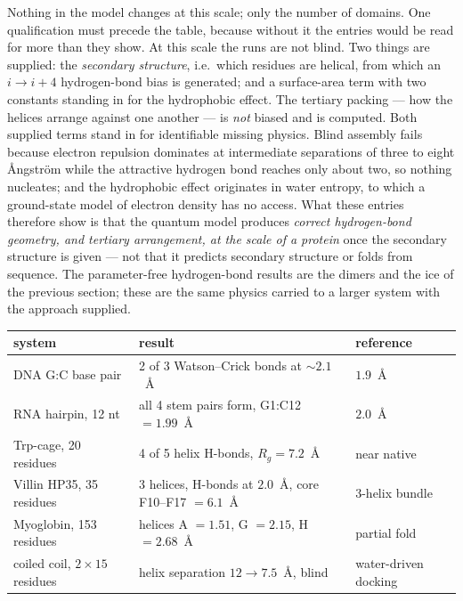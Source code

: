 \documentclass[11pt]{article}
\begin{document}
Nothing in the model changes at this scale; only the number of domains. One qualification must
precede the table, because without it the entries would be read for more than they show. At this
scale the runs are not blind. Two things are supplied: the \emph{secondary structure}, i.e.\ which
residues are helical, from which an $i \rightarrow i{+}4$ hydrogen-bond bias is generated; and a
surface-area term with two constants standing in for the hydrophobic effect. The tertiary
packing --- how the helices arrange against one another --- is \emph{not} biased and is computed.
Both supplied terms stand in for identifiable missing physics. Blind assembly fails because
electron repulsion dominates at intermediate separations of three to eight \AA ngstr\"om while the
attractive hydrogen bond reaches only about two, so nothing nucleates; and the hydrophobic effect
originates in water entropy, to which a ground-state model of electron density has no access.
What these entries therefore show is that the quantum model produces \emph{correct hydrogen-bond
geometry, and tertiary arrangement, at the scale of a protein} once the secondary structure is
given --- not that it predicts secondary structure or folds from sequence. The parameter-free hydrogen-bond results are the dimers and
the ice of the previous section; these are the same physics carried to a larger system with the
approach supplied.

\begin{center}
\begin{tabular}{lll}
\toprule
system & result & reference \\
\midrule
DNA G:C base pair          & 2 of 3 Watson--Crick bonds at $\sim 2.1$~\AA & $1.9$~\AA \\
RNA hairpin, 12 nt         & all 4 stem pairs form, G1:C12 $= 1.99$~\AA & $2.0$~\AA \\
Trp-cage, 20 residues      & 4 of 5 helix H-bonds, $R_g = 7.2$~\AA & near native \\
Villin HP35, 35 residues   & 3 helices, H-bonds at $2.0$~\AA, core F10--F17 $=6.1$~\AA & 3-helix bundle \\
Myoglobin, 153 residues    & helices A $=1.51$, G $=2.15$, H $=2.68$~\AA & partial fold \\
coiled coil, $2\times15$ residues & helix separation $12 \rightarrow 7.5$~\AA, blind & water-driven docking \\
\bottomrule
\end{tabular}
\end{center}
\end{document}
